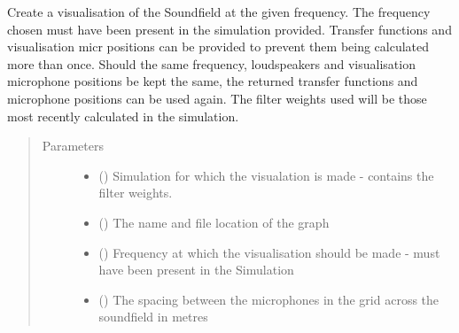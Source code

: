 \documentclass[letterpaper,10pt,english]{sphinxmanual}
\begin{document}
\begin{fulllineitems}
\begin{fulllineitems}
\begin{quote}
\begin{description}
\end{description}\end{quote}

\end{fulllineitems}


\begin{fulllineitems}
\label{\detokenize{source/pyzones:pyzones.Soundfield.visualise}}
Create a visualisation of the Soundfield at the given frequency. The frequency chosen must have been present in
the simulation provided. Transfer functions and visualisation micr positions can be provided to prevent them
being calculated more than once. Should the same frequency, loudspeakers and visualisation microphone positions
be kept the same, the returned transfer functions and microphone positions can be used again. The filter weights
used will be those most recently calculated in the simulation.
\begin{quote}\begin{description}
\item[{Parameters}] \leavevmode\begin{itemize}
\item {} 
 ({\hyperref[\detokenize{source/pyzones:pyzones.Simulation}]{}}) \textendash{} Simulation for which the visualation is made - contains the filter weights.

\item {} 
 () \textendash{} The name and file location of the graph

\item {} 
 () \textendash{} Frequency at which the visualisation should be made - must have been present in the Simulation

\item {} 
 () \textendash{} The spacing between the microphones in the grid across the soundfield in metres


\end{itemize}
\end{description}
\end{quote}
\end{fulllineitems}
\end{fulllineitems}
\end{document}
